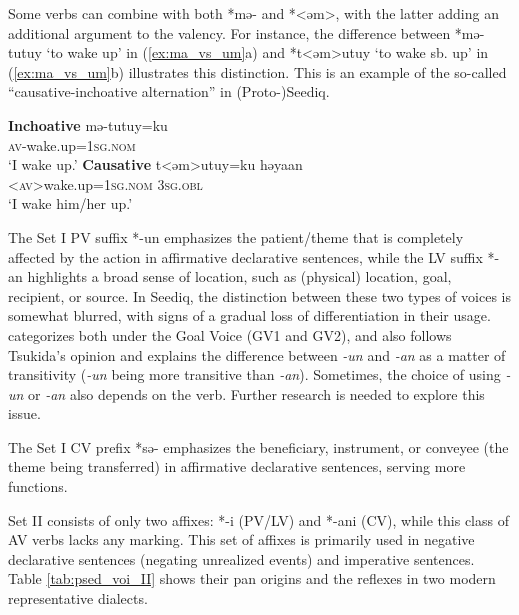 Some verbs can combine with both *mə- and *<əm>, with the latter adding an additional argument to the valency. For instance, the difference between *mə-tutuy `to wake up' in (\ref{ex:ma_vs_um}a) and *t<əm>utuy `to wake sb. up' in (\ref{ex:ma_vs_um}b) illustrates this distinction. This is an example of the so-called ``causative-inchoative alternation'' in (Proto-)Seediq.

\begin{exe}
\ex \label{ex:ma_vs_um}
    \begin{xlist}
    \ex \textbf{Inchoative}
    \gll *mə-tutuy=ku\\
    \textsc{av}-wake.up=\textsc{1sg.nom}\\
    \glt `I wake up.'
    \ex \textbf{Causative}
    \gll *t<əm>utuy=ku həyaan\\
    <\textsc{av}>wake.up=\textsc{1sg.nom} \textsc{3sg.obl}\\
    \glt `I wake him/her up.'
    \end{xlist}
\end{exe}

The Set I PV suffix *-un emphasizes the patient/theme that is completely affected by the action in affirmative declarative sentences, while the LV suffix *-an highlights a broad sense of location, such as (physical) location, goal, recipient, or source. In Seediq, the distinction between these two types of voices is somewhat blurred, with signs of a gradual loss of differentiation in their usage. \textcite{tsukida2009} categorizes both under the Goal Voice (GV1 and GV2), and \textcite{tang2015} also follows Tsukida's opinion and explains the difference between \textit{-un} and \textit{-an} as a matter of transitivity (\textit{-un} being more transitive than \textit{-an}). Sometimes, the choice of using \textit{-un} or \textit{-an} also depends on the verb. Further research is needed to explore this issue.


The Set I CV prefix *sə- emphasizes the beneficiary, instrument, or conveyee (the theme being transferred) in affirmative declarative sentences, serving more functions.

Set II consists of only two affixes: *-i (PV/LV) and *-ani (CV), while this class of AV verbs lacks any marking. This set of affixes is primarily used in negative declarative sentences (negating unrealized events) and imperative sentences. Table \ref{tab:psed_voi_II} shows their \acl{pan} origins and the reflexes in two modern representative dialects.


